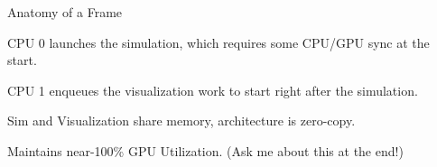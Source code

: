 \begin{frame}{Anatomy of a Frame}
    \vfill\null
    \begin{wideitemize}
        \item CPU 0 launches the simulation, which requires some CPU/GPU sync at the start.
        \item CPU 1 enqueues the visualization work to start right after the simulation.
        \item Sim and Visualization share memory, architecture is zero-copy.
        \item Maintains near-100\% GPU Utilization. (Ask me about this at the end!)
    \end{wideitemize}
\end{frame}

